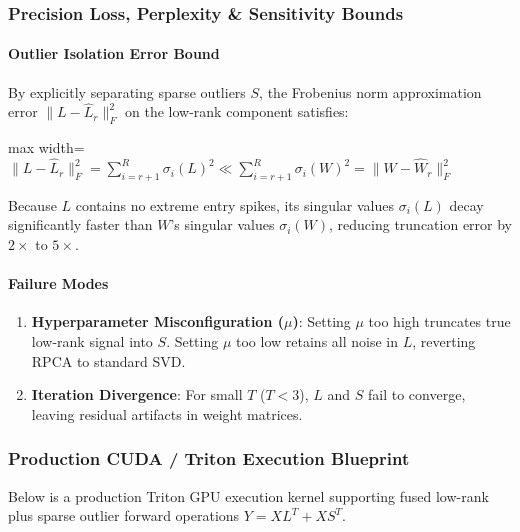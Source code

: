 \subsubsection*{Precision Loss, Perplexity \& Sensitivity Bounds}

\paragraph{Outlier Isolation Error Bound}
By explicitly separating sparse outliers $S$, the Frobenius norm approximation error $\|L - \hat{L}_r\|_F^2$ on the low-rank component satisfies:

\begin{center}
\begin{adjustbox}{max width=\columnwidth}
$\displaystyle
\|L - \hat{L}_r\|_F^2 = \sum_{i=r+1}^{R} \sigma_i(L)^2 \ll \sum_{i=r+1}^{R} \sigma_i(W)^2 = \|W - \hat{W}_r\|_F^2
$
\end{adjustbox}
\end{center}

Because $L$ contains no extreme entry spikes, its singular values $\sigma_i(L)$ decay significantly faster than $W$'s singular values $\sigma_i(W)$, reducing truncation error by $2\times$ to $5\times$.

\paragraph{Failure Modes}
\begin{enumerate}
\item \textbf{Hyperparameter Misconfiguration ($\mu$)}: Setting $\mu$ too high truncates true low-rank signal into $S$. Setting $\mu$ too low retains all noise in $L$, reverting RPCA to standard SVD.
\item \textbf{Iteration Divergence}: For small $T$ ($T < 3$), $L$ and $S$ fail to converge, leaving residual artifacts in weight matrices.


\end{enumerate}
\subsubsection*{Production CUDA / Triton Execution Blueprint}

Below is a production Triton GPU execution kernel supporting fused low-rank plus sparse outlier forward operations $Y = X L^T + X S^T$.

